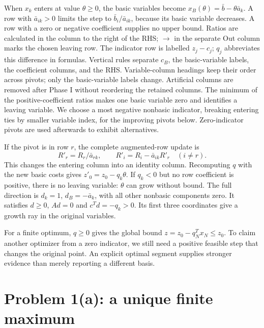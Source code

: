 \documentclass[11pt,a4paper]{article}
\begin{document}
When $x_k$ enters at value $\theta\geq0$, the basic variables become
$x_B(\theta)=\bar b-\theta\bar a_k$. A row with $\bar a_{ik}>0$
limits the step to $\bar b_i/\bar a_{ik}$, because its basic variable decreases.
A row with a zero or negative coefficient supplies no upper bound. Ratios are calculated in the column to the right of the RHS;
$\longrightarrow$ in the separate Out column marks the chosen leaving row.
The indicator row is labelled $z_j-c_j$; $q_j$ abbreviates this difference
in formulas. Vertical rules separate $c_B$, the basic-variable labels,
the coefficient columns, and the RHS. Variable-column headings keep their
order across pivots; only the basic-variable labels change. Artificial
columns are removed after Phase I without reordering the retained columns.
The minimum of the positive-coefficient ratios makes one basic variable zero
and identifies a leaving variable. We choose a most negative nonbasic
indicator, breaking entering ties by smaller variable index, for the improving
pivots below. Zero-indicator pivots are used afterwards to exhibit alternatives.

If the pivot is in row $r$, the complete augmented-row update is
\[
  R'_r=R_r/\bar a_{rk},\qquad
  R'_i=R_i-\bar a_{ik}R'_r\quad(i\ne r).
\]
This changes the entering column into an identity column. Recomputing $q$
with the new basic costs gives $z'_0=z_0-q_k\theta$.
If $q_k<0$ but no row coefficient is positive, there is no leaving variable:
$\theta$ can grow without bound. The full direction is
$d_k=1$, $d_B=-\bar a_k$, with all other nonbasic components zero.
It satisfies $d\geq0$, $Ad=0$ and $c^Td=-q_k>0$.
Its first three coordinates give a growth ray in the original variables.

For a finite optimum, $q\geq0$ gives the global bound
$z=z_0-q_N^Tx_N\leq z_0$. To claim another optimizer from a zero indicator,
we still need a positive feasible step that changes the original point.
An explicit optimal segment supplies stronger evidence than merely reporting
a different basis.

\section{Problem 1(a): a unique finite maximum}\label{sec:a}
\end{document}
